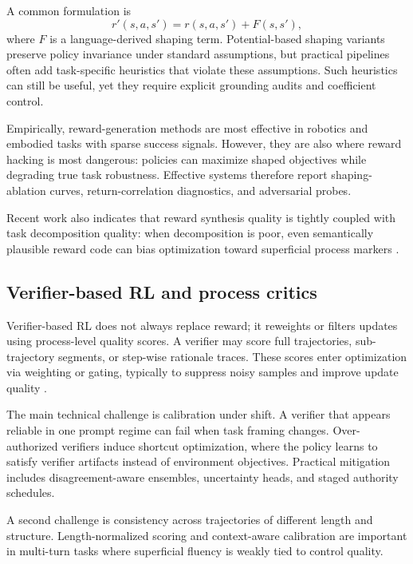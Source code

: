 \documentclass[pdflatex,sn-mathphys-num]{sn-jnl}
\begin{document}
A common formulation is
\begin{equation}
r'(s,a,s') = r(s,a,s') + F(s,s'),
\label{eq:reward_shaping_general}
\end{equation}
where $F$ is a language-derived shaping term. Potential-based shaping variants preserve policy invariance under standard assumptions, but practical pipelines often add task-specific heuristics that violate these assumptions. Such heuristics can still be useful, yet they require explicit grounding audits and coefficient control.

Empirically, reward-generation methods are most effective in robotics and embodied tasks with sparse success signals. However, they are also where reward hacking is most dangerous: policies can maximize shaped objectives while degrading true task robustness. Effective systems therefore report shaping-ablation curves, return-correlation diagnostics, and adversarial probes.

Recent work also indicates that reward synthesis quality is tightly coupled with task decomposition quality: when decomposition is poor, even semantically plausible reward code can bias optimization toward superficial process markers \cite{arxiv_p_2509_23863,arxiv_p_2510_10197,arxiv_p_2601_15690}.

\subsection{Verifier-based RL and process critics}
Verifier-based RL does not always replace reward; it reweights or filters updates using process-level quality scores. A verifier may score full trajectories, sub-trajectory segments, or step-wise rationale traces. These scores enter optimization via weighting or gating, typically to suppress noisy samples and improve update quality \cite{arxiv_p_2602_06493,arxiv_p_2602_12579,arxiv_p_2601_06845,arxiv_p_2602_02395}.

The main technical challenge is calibration under shift. A verifier that appears reliable in one prompt regime can fail when task framing changes. Over-authorized verifiers induce shortcut optimization, where the policy learns to satisfy verifier artifacts instead of environment objectives. Practical mitigation includes disagreement-aware ensembles, uncertainty heads, and staged authority schedules.

A second challenge is consistency across trajectories of different length and structure. Length-normalized scoring and context-aware calibration are important in multi-turn tasks where superficial fluency is weakly tied to control quality.
\end{document}
